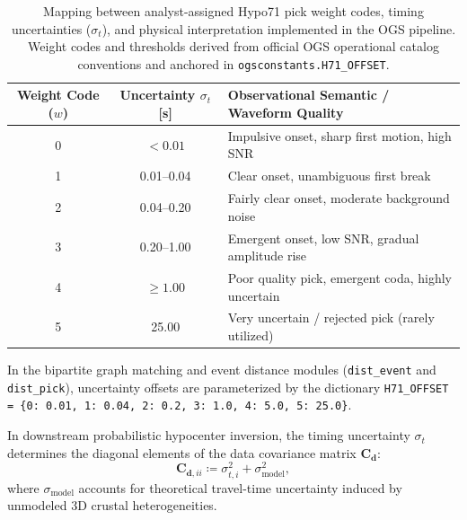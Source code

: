 \begin{table}[htbp]
  \centering
  \small
  \caption{Mapping between analyst-assigned Hypo71 pick weight codes, timing
    uncertainties ($\sigma_t$), and physical interpretation implemented in the
    \ac{OGS} pipeline. Weight codes and thresholds derived from official
    \ac{OGS} operational catalog conventions and anchored in
    \texttt{ogsconstants.H71\_OFFSET}.
  }
  \label{tab:h71_weights}
  \begin{threeparttable}
    \begin{tabularx}{\linewidth}{c c >{\raggedright\arraybackslash}X}
      \toprule
      \textbf{Weight Code ($w$)} &
      \textbf{Uncertainty $\sigma_t$ [\unit{\second}]\tnote{a}} &
      \textbf{Observational Semantic / Waveform Quality} \\
      \midrule
      \num{0} & $< \num{0.01}$     & Impulsive onset,
      sharp first motion, high \ac{SNR} \\
      \num{1} & \numrange{0.01}{0.04} & Clear onset,
      unambiguous first break \\
      \num{2} & \numrange{0.04}{0.20} & Fairly clear
      onset, moderate background
      noise \\
      \num{3} & \numrange{0.20}{1.00} & Emergent
      onset, low \ac{SNR}, gradual amplitude rise \\
      \num{4} & $\ge \num{1.00}$    & Poor quality pick, emergent
      coda, highly uncertain \\
      \num{5} & \num{25.00}      & Very uncertain / rejected pick
      (rarely utilized) \\
      \bottomrule
    \end{tabularx}
    \begin{tablenotes}[flushleft]
      \footnotesize
    \item[a] In the bipartite graph matching and event distance
      modules (\texttt{dist\_event} and \texttt{dist\_pick}),
      uncertainty offsets are parameterized by the dictionary
      \texttt{H71\_OFFSET = \{0: 0.01, 1: 0.04, 2: 0.2, 3: 1.0, 4:
      5.0, 5: 25.0\}}.
    \end{tablenotes}
  \end{threeparttable}
\end{table}

In downstream probabilistic hypocenter inversion, the timing
uncertainty $\sigma_t$ determines the diagonal elements of the data
covariance matrix $\mathbf{C}_{\mathbf{d}}$:
\begin{equation}
  \mathbf{C}_{\mathbf{d}, ii} \coloneqq \sigma_{t, i}^2 +
  \sigma_{\mathrm{model}}^2,
  \label{eq:data_covariance}
\end{equation}
where $\sigma_{\mathrm{model}}$ accounts for theoretical travel-time
uncertainty induced by unmodeled 3D crustal heterogeneities.

